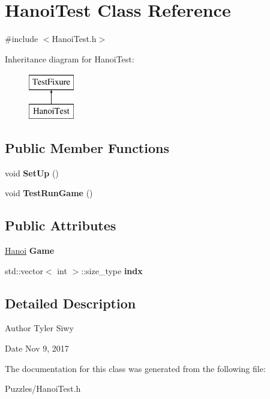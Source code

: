 \hypertarget{classHanoiTest}{\section{Hanoi\-Test Class Reference}
\label{classHanoiTest}
}


{\ttfamily \#include $<$Hanoi\-Test.\-h$>$}

Inheritance diagram for Hanoi\-Test\-:\begin{figure}[H]
\begin{center}
\leavevmode
\includegraphics[height=2.000000cm]{classHanoiTest}
\end{center}
\end{figure}
\subsection*{Public Member Functions}
\begin{DoxyCompactItemize}
\item 
\hypertarget{classHanoiTest_a4b20d56cb0865c484c42f573699c9eda}{void {\bfseries Set\-Up} ()}\label{classHanoiTest_a4b20d56cb0865c484c42f573699c9eda}

\item 
\hypertarget{classHanoiTest_a7c51427b14c30753298e703edcb95f19}{void {\bfseries Test\-Run\-Game} ()}\label{classHanoiTest_a7c51427b14c30753298e703edcb95f19}

\end{DoxyCompactItemize}
\subsection*{Public Attributes}
\begin{DoxyCompactItemize}
\item 
\hypertarget{classHanoiTest_a4286e0f6ecc226a3d4848f2fb29f263b}{\hyperlink{classHanoi}{Hanoi} {\bfseries Game}}\label{classHanoiTest_a4286e0f6ecc226a3d4848f2fb29f263b}

\item 
\hypertarget{classHanoiTest_a0e37b5371b33e3ae17096aadf3d53bcf}{std\-::vector$<$ int $>$\-::size\-\_\-type {\bfseries indx}}\label{classHanoiTest_a0e37b5371b33e3ae17096aadf3d53bcf}

\end{DoxyCompactItemize}


\subsection{Detailed Description}
\begin{DoxyAuthor}{Author}
Tyler Siwy 
\end{DoxyAuthor}
\begin{DoxyDate}{Date}
Nov 9, 2017 
\end{DoxyDate}


The documentation for this class was generated from the following file\-:\begin{DoxyCompactItemize}
\item 
Puzzles/Hanoi\-Test.\-h\end{DoxyCompactItemize}
